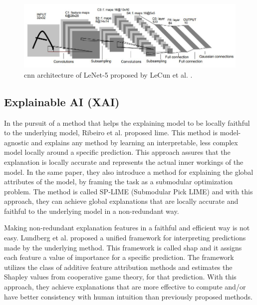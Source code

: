 \begin{figure}[htb]
    \centering
    \includegraphics[width=12cm]{images/LeNet.jpg}
    \caption{\gls{cnn} architecture of LeNet-5 proposed by LeCun et al. \cite{lecunGradientbasedLearningApplied1998}.}
    \label{fig:lenet}
\end{figure} 

\subsection{Explainable AI (XAI)}


In the pursuit of a method that helps the explaining model to be locally faithful to the underlying model, Ribeiro et al. \cite{ribeiroWhyShouldTrust2016} proposed \gls{lime}. This method is model-agnostic and explains any method by learning an interpretable, less complex model locally around a specific prediction. This approach assures that the explanation is locally accurate and represents the actual inner workings of the model. 
In the same paper, they also introduce a method for explaining the global attributes of the model, by framing the task as a submodular optimization problem. The method is called SP-LIME (Submodular Pick LIME) and with this approach, they can achieve global explanations that are locally accurate and faithful to the underlying model in a non-redundant way.

Making non-redundant explanation features in a faithful and efficient way is not easy. Lundberg et al. \cite{lundbergUnifiedApproachInterpreting2017} proposed a unified framework for interpreting predictions made by the underlying method. This framework is called \gls{shap} and it assigns each feature a value of importance for a specific prediction. The framework utilizes the class of additive feature attribution methods and estimates the Shapley %
values from cooperative game theory, for that prediction. With this approach, they achieve explanations that are more effective to compute and/or have better consistency with human intuition than previously proposed methods.  


